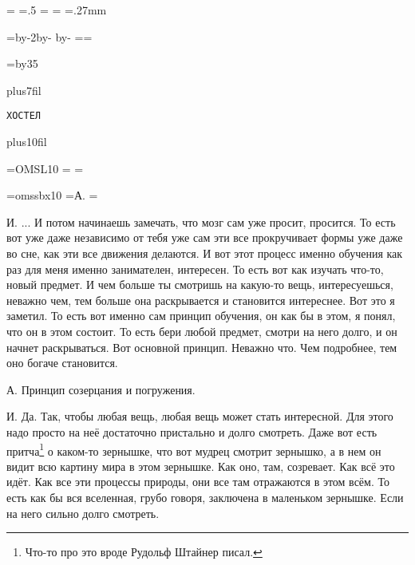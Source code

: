 \pdfpagewidth=297mm
\pdfpageheight=210mm
\pdfhorigin=1in
\pdfvorigin=0pt

\shhtotal=\pdfpagewidth
\htotal=.5\shhtotal
\vtotal=\pdfpageheight
\shoutline=0pt
\shstaplewidth=0pt
\shcrop=0pt
\shfootline={}
\shthickness=.27mm

\horigin=9mm
\hoffset=9mm
\hsize=\htotal \advance\hsize by-2\horigin \advance\hsize by-\hoffset
\advance\hsize by-\QUIRE
\output={\ifodd\pageno\else\hoffset=\QUIRE\fi \plainoutput}

\vorigin=15mm
\vsize=\topskip \advance\vsize by35\baselineskip

\nopagenumbers
\topglue 0pt plus7fil
\centerline{\tt Х\qquad О\qquad С\qquad Т\qquad Е\qquad Л}
\vskip 0pt plus10fil
\eject
{}

\font\TENSL=OMSL10
\headline={\line{\hrulefill}}
\footline={\line{\hss\tenrm\folio\hss}}

\font\speakerF=omssbx10
\def\A{\item{\speakerF А.}}
\def\I{\item{\speakerF И.}}
=\hbox{\speakerF А.\enskip}
\parindent=


\I
... И потом начинаешь замечать, что мозг сам уже просит, просится.
То есть вот уже даже независимо от тебя уже сам эти все прокручивает формы уже даже во сне,
как эти все движения делаются.
И вот этот процесс именно обучения как раз для меня именно занимателен, интересен.
То есть вот как изучать что-то, новый предмет.
И чем больше ты смотришь на какую-то вещь, интересуешься, неважно чем,
тем больше она раскрывается и становится интереснее.
Вот это я заметил.
То есть вот именно сам принцип обучения, он как бы в этом, я понял, что он в этом состоит.
То есть бери любой предмет, смотри на него долго, и он начнет раскрываться.
Вот основной принцип.
Неважно что.
Чем подробнее, тем оно богаче становится.

\A
Принцип созерцания и погружения.

\I
Да.
Так, чтобы любая вещь, любая вещь может стать интересной.
Для этого надо просто на неё достаточно пристально и долго смотреть.
Даже вот есть притча\footnote*{Что-то про это вроде Рудольф Штайнер писал.} о каком-то зернышке, что вот мудрец смотрит зернышко,
а в нем он видит всю картину мира в этом зернышке.
Как оно, там, созревает.
Как всё это идёт.
Как все эти процессы природы, они все там отражаются в этом всём.
То есть как бы вся вселенная, грубо говоря, заключена в маленьком зернышке.
Если на него сильно долго смотреть.

